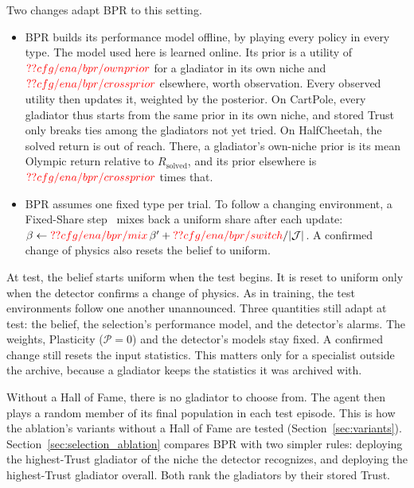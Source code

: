 Two changes adapt BPR to this setting.
\begin{itemize}
\item BPR builds its performance model offline, by playing every policy in every type. The model used here is learned online. Its prior is a utility of $\Res{cfg/ena/bpr/ownprior}$ for a gladiator in its own niche and $\Res{cfg/ena/bpr/crossprior}$ elsewhere, worth  observation. Every observed utility then updates it, weighted by the posterior. On CartPole, every gladiator thus starts from the same prior in its own niche, and stored Trust only breaks ties among the gladiators not yet tried. On HalfCheetah, the solved return is out of reach. There, a gladiator's own-niche prior is its mean Olympic return relative to $R_{\text{solved}}$, and its prior elsewhere is $\Res{cfg/ena/bpr/crossprior}$ times that.
\item BPR assumes one fixed type per trial. To follow a changing environment, a Fixed-Share step~\citep{herbster1998tracking} mixes back a uniform share after each update: $\beta \leftarrow \Res{cfg/ena/bpr/mix}\,\beta' + \Res{cfg/ena/bpr/switch}/|\mathcal{J}|$. A confirmed change of physics also resets the belief to uniform.
\end{itemize}
At test, the belief starts uniform when the test begins. It is reset to uniform only when the detector confirms a change of physics. As in training, the test environments follow one another unannounced. Three quantities still adapt at test: the belief, the selection's performance model, and the detector's alarms. The weights, Plasticity ($\mathcal{P}=0$) and the detector's models stay fixed. A confirmed change still resets the input statistics. This matters only for a specialist outside the archive, because a gladiator keeps the statistics it was archived with.

Without a Hall of Fame, there is no gladiator to choose from. The agent then plays a random member of its final population in each test episode. This is how the ablation's variants without a Hall of Fame are tested (Section~\ref{sec:variants}). Section~\ref{sec:selection_ablation} compares BPR with two simpler rules: deploying the highest-Trust gladiator of the niche the detector recognizes, and deploying the highest-Trust gladiator overall. Both rank the gladiators by their stored Trust.
